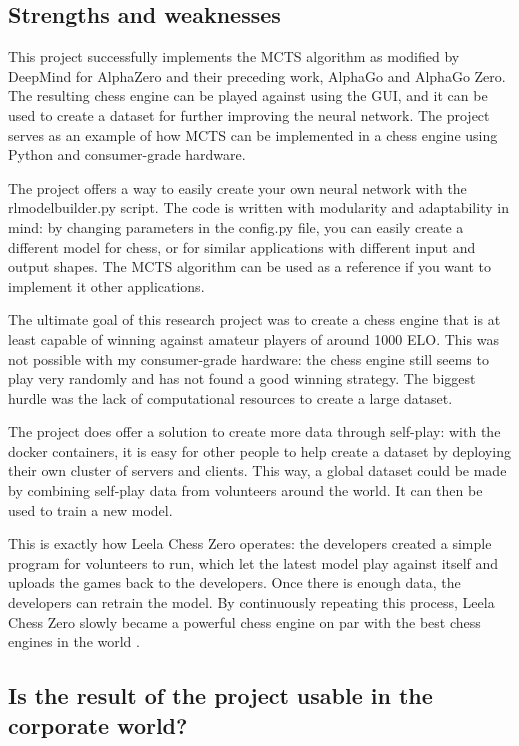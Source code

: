 \documentclass{article}
\begin{document}
\subsection{Strengths and weaknesses}

This project successfully implements the MCTS algorithm as modified by DeepMind for AlphaZero and their preceding work,
AlphaGo and AlphaGo Zero. The resulting chess engine can be played against using the GUI, and it can be used to create
a dataset for further improving the neural network. The project serves as an example of how MCTS can be implemented
in a chess engine using Python and consumer-grade hardware. 

The project offers a way to easily create your own neural network with the rlmodelbuilder.py script.
The code is written with modularity and adaptability in mind: by changing parameters in the config.py file, 
you can easily create a different model for chess, or for similar applications with different input and output shapes. 
The MCTS algorithm can be used as a reference if you want to implement it other applications.

The ultimate goal of this research project was to create a chess engine that is at least capable of winning
against amateur players of around 1000 ELO. This was not possible with my consumer-grade hardware: 
the chess engine still seems to play very randomly and has not found a good winning strategy. 
The biggest hurdle was the lack of computational resources to create a large dataset.

The project does offer a solution to create more data through self-play: with the docker containers, 
it is easy for other people to help create a dataset by deploying their own cluster of servers and clients. 
This way, a global dataset could be made by combining self-play data from volunteers around the world. 
It can then be used to train a new model. 

This is exactly how Leela Chess Zero operates: the developers created a simple program for volunteers to run,
which let the latest model play against itself and uploads the games back to the developers. Once there is
enough data, the developers can retrain the model. By continuously repeating this process, Leela Chess Zero
slowly became a powerful chess engine on par with the best chess engines in the world \cite{TopChessEngine2022}.

\subsection{Is the result of the project usable in the corporate world?}
\end{document}
